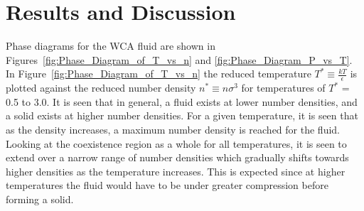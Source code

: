 \documentclass[double,12pt]{beavtex}
\begin{document}


\chapter{Results and Discussion}

Phase diagrams for the WCA fluid are shown in Figures~\ref{fig:Phase_Diagram_of_T_vs_n} 
and \ref{fig:Phase_Diagram_P_vs_T}. 
In Figure~\ref{fig:Phase_Diagram_of_T_vs_n} the reduced temperature 
$T^*\equiv\frac{kT}{\epsilon}$ is plotted against the reduced number density 
$n^*\equiv n\sigma^3$ for temperatures of $T^*$ = 0.5 to 3.0. 
It is seen that in general, a fluid exists at lower number densities, 
and a solid exists at higher number densities. 
For a given temperature, it is seen that as the density increases, 
a maximum number density is reached for the fluid. 
Looking at the coexistence region as a whole for all temperatures, 
it is seen to extend over a narrow range of number densities which 
gradually shifts towards higher densities as the temperature increases. 
This is expected since at higher temperatures the fluid would have to 
be under greater compression before forming a solid. 
\end{document}

